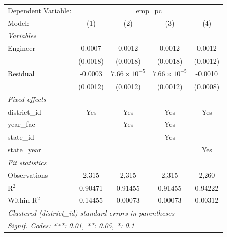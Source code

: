 
\begingroup
\centering
\begin{tabular}{lcccc}
   \tabularnewline \midrule \midrule
   Dependent Variable: & \multicolumn{4}{c}{emp\_pc}\\
   Model:        & (1)      & (2)                   & (3)                   & (4)\\  
   \midrule
   \emph{Variables}\\
   Engineer      & 0.0007   & 0.0012                & 0.0012                & 0.0012\\   
                 & (0.0018) & (0.0018)              & (0.0018)              & (0.0012)\\   
   Residual      & -0.0003  & $7.66\times 10^{-5}$  & $7.66\times 10^{-5}$  & -0.0010\\   
                 & (0.0012) & (0.0012)              & (0.0012)              & (0.0008)\\   
   \midrule
   \emph{Fixed-effects}\\
   district\_id  & Yes      & Yes                   & Yes                   & Yes\\  
   year\_fac     &          & Yes                   & Yes                   & \\  
   state\_id     &          &                       & Yes                   & \\  
   state\_year   &          &                       &                       & Yes\\  
   \midrule
   \emph{Fit statistics}\\
   Observations  & 2,315    & 2,315                 & 2,315                 & 2,260\\  
   R$^2$         & 0.90471  & 0.91455               & 0.91455               & 0.94222\\  
   Within R$^2$  & 0.14455  & 0.00073               & 0.00073               & 0.00312\\  
   \midrule \midrule
   \multicolumn{5}{l}{\emph{Clustered (district\_id) standard-errors in parentheses}}\\
   \multicolumn{5}{l}{\emph{Signif. Codes: ***: 0.01, **: 0.05, *: 0.1}}\\
\end{tabular}
\par\endgroup


